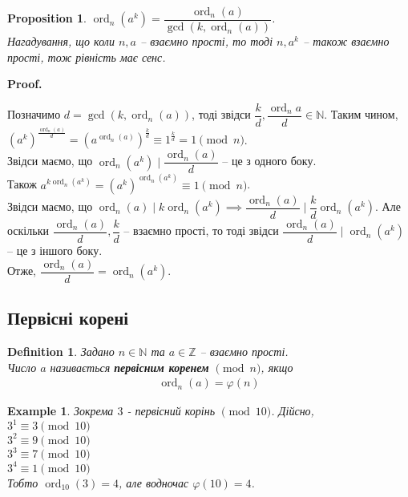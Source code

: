 \documentclass[a4paper, 14pt]{extarticle}
\makeatletter
\theoremstyle{theoremdd}
\theoremstyle{theoremdd}
\newtheorem{definition}[theorem]{Definition}
\theoremstyle{theoremdd}
\theoremstyle{theoremdd}
\newtheorem{example}[theorem]{Example}
\theoremstyle{theoremdd}
\newtheorem{proposition}[theorem]{Proposition}
\theoremstyle{theoremdd}
\theoremstyle{theoremdd}
\theoremstyle{theoremdd}
\def\qed{$\blacksquare$}
\renewenvironment{proof}[1][Proof.\\]{\par
\pushQED{\hfill \qed}%
\normalfont \topsep6\p@\@plus6\p@\relax
\trivlist
\item\relax
{\bfseries
#1\@addpunct{.}}\hspace\labelsep\ignorespaces
}{%
\popQED\endtrivlist\@endpefalse
}
\DeclareMathOperator{\ord}{ord}
\makeatother
\begin{document}
\begin{proposition}
$\ord_n (a^k) = \dfrac{\ord_n (a)}{\gcd(k,\ord_n (a))}$.\\
\textit{Нагадування, що коли $n,a$ -- взаємно прості, то тоді $n,a^k$ -- також взаємно прості, тож рівність має сенс.}
\end{proposition}

\begin{proof}
Позначимо $d = \gcd(k,\ord_n (a))$, тоді звідси $\dfrac{k}{d}, \dfrac{\ord_n a}{d} \in \mathbb{N}$. Таким чином,\\
$\left( a^k \right)^{\frac{\ord_n (a)}{d}} = \left( a^{\ord_n (a)} \right)^{\frac{k}{d}} \equiv 1^{\frac{k}{d}} = 1 \pmod n$.\\
Звідси маємо, що $\ord_n (a^k) \mid \dfrac{\ord_n (a)}{d}$ -- це з одного боку.\\
Також $a^{k \ord_n (a^k)} = (a^k)^{\ord_n (a^k)} \equiv 1 \pmod n$.\\
Звідси маємо, що $\ord_n (a) \mid k \ord_n (a^k) \implies \dfrac{\ord_n (a)}{d} \mid \dfrac{k}{d} \ord_n (a^k)$. Але оскільки $\dfrac{\ord_n (a)}{d}, \dfrac{k}{d}$ -- взаємно прості, то тоді звідси $\dfrac{\ord_n (a)}{d} \mid \ord_n (a^k)$ -- це з іншого боку.\\
Отже, $\dfrac{\ord_n (a)}{d} = \ord_n (a^k)$.
\end{proof}

\subsection{Первісні корені}
\begin{definition}
Задано $n \in \mathbb{N}$ та $a \in \mathbb{Z}$ -- взаємно прості.\\
Число $a$ називається \textbf{первісним коренем} $\!\! \pmod n$, якщо
\begin{align*}
\ord_n(a) = \varphi(n)
\end{align*}
\end{definition}

\begin{example}
Зокрема $3$ - первісний корінь $\!\! \pmod {10}$. Дійсно,\\
$3^1 \equiv 3 \pmod {10}$\\
$3^2 \equiv 9 \pmod {10}$\\
$3^3 \equiv 7 \pmod {10}$\\
$3^4 \equiv 1 \pmod {10}$\\
Тобто $\ord_{10}(3) = 4$, але водночас $\varphi(10) = 4$.
\end{example}
\end{document}
